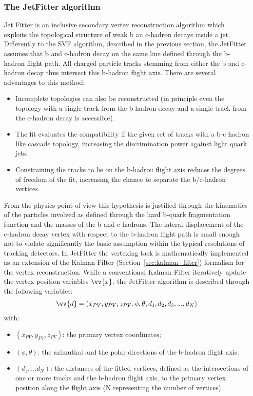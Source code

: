 \subsubsection{The JetFitter algorithm}
Jet Fitter is an inclusive secondary vertex reconstruction algorithm which exploits the topological structure of weak b an c-hadron decays inside a jet.
Differently to the SVF algorithm, described in the previous section, the JetFitter assumes that b and c-hadron decay on the same line defined through the b-hadron flight path. All charged particle tracks stemming from either the b and c-hadron decay thus intersect this b-hadron flight axis. There are several advantages to this method:
\begin{itemize}
\item Incomplete topologies can also be reconstructed (in principle even the topology with a single track from the b-hadron decay and a single track from the c-hadron decay is accessible).
\item The fit evaluates the compatibility if the given set of tracks with a b-c hadron like cascade topology, increasing the discrimination power against light quark jets.
\item Constraining the tracks to lie on the b-hadron flight axis reduces the degrees of freedom of the fit, increasing the chance to separate the b/c-hadron vertices. 
\end{itemize}
From the physics point of view this hypothesis is justified through the kinematics of the particles involved as defined through the hard b-quark fragmentation function and the masses of the b and c-hadrons. The lateral displacement of the c-hadron decay vertex with respect to the b-hadron flight path is small enough not to violate significantly the basic assumption within the typical resolutions of tracking detectors.
In JetFitter the vertexing task is mathematically implemented as an extension of the Kalman Filter (Section~\ref{sec:kalman_filter}) formalism for the vertex reconstruction. While a conventional Kalman Filter iteratively update the vertex position variables $\vv{x}$, the JetFitter algorithm is described through the following variables:
\begin{equation}
\vv{d} = (x_{PV},y_{PV},z_{PV},\phi,\theta,d_1, d_2, d_3,...,d_N)
\end{equation}
with:
\begin{itemize}
\item $(x_{PV},y_{PV},z_{PV})$: the primary vertex coordinates;
\item $(\phi,\theta)$: the azimuthal and the polar directions of the b-hadron flight axis;
\item $(d_1,...d_N)$: the distances of the fitted vertices, defined as the intersections of one or more tracks and the b-hadron flight axis, to the primary vertex position along the flight axis (N representing the number of vertices).
\end{itemize}
